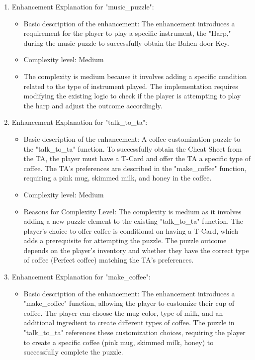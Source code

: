 \documentclass[11pt]{article}
\begin{document}
\begin{enumerate}
\begin{itemize}
  \end{itemize}

\item Enhancement Explanation for "music\_puzzle":
	\begin{itemize}
	\item Basic description of the enhancement: The enhancement introduces a requirement for the player to play a specific instrument, the "Harp," during the music puzzle to successfully obtain the Bahen door Key.
	\item Complexity level: Medium
	\item The complexity is medium because it involves adding a specific condition related to the type of instrument played. The implementation requires modifying the existing logic to check if the player is attempting to play the harp and adjust the outcome accordingly.
	\end{itemize}

\item Enhancement Explanation for "talk\_to\_ta":

  \begin{itemize}
    \item Basic description of the enhancement: A coffee customization puzzle to the "talk\_to\_ta" function. To successfully obtain the Cheat Sheet from the TA, the player must have a T-Card and offer the TA a specific type of coffee. The TA's preferences are described in the "make\_coffee" function, requiring a pink mug, skimmed milk, and honey in the coffee.
    \item Complexity level: Medium
    \item Reasons for Complexity Level: The complexity is medium as it involves adding a new puzzle element to the existing "talk\_to\_ta" function.
    The player's choice to offer coffee is conditional on having a T-Card, which adds a prerequisite for attempting the puzzle.
    The puzzle outcome depends on the player's inventory and whether they have the correct type of coffee (Perfect coffee) matching the TA's preferences.
  \end{itemize}


\item Enhancement Explanation for "make\_coffee":

  \begin{itemize}
    \item Basic description of the enhancement: The enhancement introduces a "make\_coffee" function, allowing the player to customize their cup of coffee. The player can choose the mug color, type of milk, and an additional ingredient to create different types of coffee. The puzzle in "talk\_to\_ta" references these customization choices, requiring the player to create a specific coffee (pink mug, skimmed milk, honey) to successfully complete the puzzle.


\end{itemize}
\end{enumerate}
\end{document}
